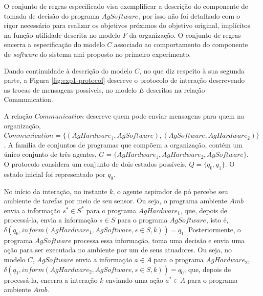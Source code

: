 O conjunto de regras especificado visa exemplificar a descrição do componente de tomada de decisão do programa $AgSoftware$, por isso não foi detalhado com o rigor necessário para realizar os objetivos próximos do objetivo original, implícitos na função utilidade descrita no modelo $F$ da organização. O conjunto de regras encerra a especificação do modelo $C$ associado ao comportamento do componente de \textit{software} do sistema \acrshort{ami} proposto no primeiro experimento.

Dando continuidade à descrição do modelo $C$, no que diz respeito à sua segunda parte, a Figura \ref{fig:exp1-protocol} descreve o protocolo de interação descrevendo as trocas de mensagens possíveis, no modelo $E$ descritas na relação Communication.

\begin{figure}[h!]
    \centering
\end{figure}

A relação $Communication$ descreve quem pode enviar mensagens para quem na organização, $Communication = \{(AgHardware_1, AgSoftware), (AgSoftware, AgHardware_2)\}$. A família de conjuntos de programas que compõem a organização, contém um único conjunto de três agentes, $G = \{{AgHardware_1, AgHardware_2, AgSoftware}\}$. O protocolo considera um conjunto de dois estados possíveis, $Q = \{q_0, q_1\}$. O estado inicial foi representado por $q_0$.

No início da interação, no instante $k$, o agente aspirador de pó percebe seu ambiente de tarefas por meio de seu sensor. Ou seja, o programa ambiente $Amb$ envia a informação $s^* \in S^*$ para o programa $AgHardware_1$, que, depois de processá-la, envia a informação $s \in S$ para o programa $AgSoftware$, isto é, $\delta(q_0, inform(AgHardware_1, AgSoftware, s \in S, k)) = q_1$. Posteriormente, o programa $AgSoftware$ processa essa informação, toma uma decisão e envia uma ação para ser executada no ambiente por um de seus atuadores. Ou seja, no modelo $C$, $AgSoftware$ envia a informação $a \in A$ para o programa $AgHardware_2$, $\delta(q_1, inform(AgHardware_2, AgSoftware, s \in S, k)) = q_0$, que, depois de processá-la, encerra a interação $k$ enviando uma ação $a^* \in A$ para o programa ambiente $Amb$.

